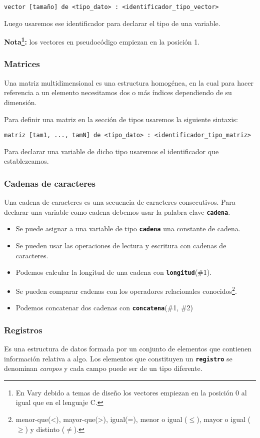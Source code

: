 \documentclass{article}
\newcommand{\pkeyword}[1]{\textcolor{azulpseudo}{\texttt{\textbf{#1}}}}
\begin{document}
\begin{lstlisting}[language = pseudocodigoesp]
vector [tamaño] de <tipo_dato> : <identificador_tipo_vector>  
\end{lstlisting}

Luego usaremos ese identificador para declarar el tipo de una variable.

\textbf{Nota\footnote{En Vary debido a temas de diseño los vectores empiezan en la posición 0 al igual que en el lenguaje C.}:} los vectores en pseudocódigo empiezan en la posición 1.
\subsubsection{Matrices}
Una matriz multidimensional es una estructura homogénea, en la cual para hacer referencia a un elemento necesitamos dos o más índices dependiendo de su dimensión.

Para definir una matriz en la sección de tipos usaremos la siguiente sintaxis:
\begin{lstlisting}[language = pseudocodigoesp]
matriz [tam1, ..., tamN] de <tipo_dato> : <identificador_tipo_matriz>
\end{lstlisting}

Para declarar una variable de dicho tipo usaremos el identificador que establezcamos.
\subsubsection{Cadenas de caracteres}
Una cadena de caracteres es una secuencia de caracteres consecutivos. Para declarar una variable como cadena debemos usar la palabra clave \pkeyword{cadena}.
\begin{itemize}
\item Se puede asignar a una variable de tipo \pkeyword{cadena} una constante de cadena.
\item Se pueden usar las operaciones de lectura y escritura con cadenas de caracteres.
\item Podemos calcular la longitud de una cadena con \pkeyword{longitud}(\#1).
\item Se pueden comparar cadenas con los operadores relacionales conocidos\footnote{menor-que(<), mayor-que(>), igual(=), menor o igual ($\leq$), mayor o igual ($\geq$) y distinto ($\neq$).}.
\item Podemos concatenar dos cadenas con \pkeyword{concatena}(\#1, \#2)
\end{itemize}

\subsubsection{Registros}
Es una estructura de datos formada por un conjunto de elementos que contienen información relativa a algo. Los elementos que constituyen un \pkeyword{registro} se denominan \emph{campos} y cada campo puede ser de un tipo diferente.
\pagebreak
\end{document}
